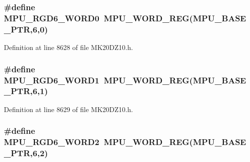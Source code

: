 \subsubsection[{\texorpdfstring{M\+P\+U\+\_\+\+R\+G\+D6\+\_\+\+W\+O\+R\+D0}{MPU_RGD6_WORD0}}]{\setlength{\rightskip}{0pt plus 5cm}\#define M\+P\+U\+\_\+\+R\+G\+D6\+\_\+\+W\+O\+R\+D0~{\bf M\+P\+U\+\_\+\+W\+O\+R\+D\+\_\+\+R\+EG}({\bf M\+P\+U\+\_\+\+B\+A\+S\+E\+\_\+\+P\+TR},6,0)}\hypertarget{group___m_p_u___register___accessor___macros_ga4bd65032a314b6e4f466a5881f3f4b35}{}\label{group___m_p_u___register___accessor___macros_ga4bd65032a314b6e4f466a5881f3f4b35}


Definition at line 8628 of file M\+K20\+D\+Z10.\+h.

\subsubsection[{\texorpdfstring{M\+P\+U\+\_\+\+R\+G\+D6\+\_\+\+W\+O\+R\+D1}{MPU_RGD6_WORD1}}]{\setlength{\rightskip}{0pt plus 5cm}\#define M\+P\+U\+\_\+\+R\+G\+D6\+\_\+\+W\+O\+R\+D1~{\bf M\+P\+U\+\_\+\+W\+O\+R\+D\+\_\+\+R\+EG}({\bf M\+P\+U\+\_\+\+B\+A\+S\+E\+\_\+\+P\+TR},6,1)}\hypertarget{group___m_p_u___register___accessor___macros_gaed36481f3a64687f55a12c42d8af6c1b}{}\label{group___m_p_u___register___accessor___macros_gaed36481f3a64687f55a12c42d8af6c1b}


Definition at line 8629 of file M\+K20\+D\+Z10.\+h.

\subsubsection[{\texorpdfstring{M\+P\+U\+\_\+\+R\+G\+D6\+\_\+\+W\+O\+R\+D2}{MPU_RGD6_WORD2}}]{\setlength{\rightskip}{0pt plus 5cm}\#define M\+P\+U\+\_\+\+R\+G\+D6\+\_\+\+W\+O\+R\+D2~{\bf M\+P\+U\+\_\+\+W\+O\+R\+D\+\_\+\+R\+EG}({\bf M\+P\+U\+\_\+\+B\+A\+S\+E\+\_\+\+P\+TR},6,2)}\hypertarget{group___m_p_u___register___accessor___macros_ga59bdc9a413fde445d2420dcb633d8423}{}\label{group___m_p_u___register___accessor___macros_ga59bdc9a413fde445d2420dcb633d8423}


